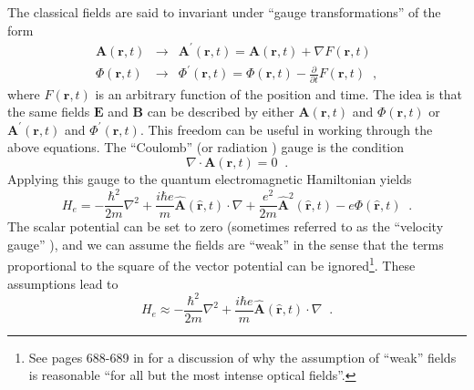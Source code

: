 The classical fields are said to invariant under ``gauge transformations'' of the form
\begin{eqnarray*}
\mathbf{A}\left(\mathbf{r},t\right)&\rightarrow & \mathbf{A}^\prime\left(\mathbf{r},t\right)=\mathbf{A}\left(\mathbf{r},t\right)+\nabla F\left(\mathbf{r},t\right)\\
\Phi\left(\mathbf{r},t\right) &\rightarrow & \Phi^\prime\left(\mathbf{r},t\right) = \Phi\left(\mathbf{r},t\right) - \frac{\partial}{\partial t} F\left(\mathbf{r},t\right)\;\;,
\end{eqnarray*}
where $F\left(\mathbf{r},t\right)$ is an arbitrary function of the position and time.  The idea is that the same fields $\mathbf{E}$ and $\mathbf{B}$ can be described by either $\mathbf{A}\left(\mathbf{r},t\right)$ and $\Phi\left(\mathbf{r},t\right)$ or $\mathbf{A}^\prime\left(\mathbf{r},t\right)$ and $\Phi^\prime\left(\mathbf{r},t\right)$.  This freedom can be useful in working through the above equations.  The ``Coulomb'' (or radiation \cite{Cohen1997}) gauge is the condition
$$
\nabla\cdot\mathbf{A}\left(\mathbf{r},t\right)=0\;\;.
$$
Applying this gauge to the quantum electromagnetic Hamiltonian yields
$$
H_e = -\frac{\hbar^2}{2m}\nabla^2 + \frac{i\hbar e}{m}\hat{\mathbf{A}}\left(\hat{\mathbf{r}},t\right)\cdot\nabla+\frac{e^2}{2m}\hat{\mathbf{A}}^2\left(\hat{\mathbf{r}},t\right)-e\Phi(\hat{\mathbf{r}},t)\;\;.
$$
The scalar potential can be set to zero (sometimes referred to as the ``velocity gauge'' \cite{Faisal1987}), and we can assume the fields are ``weak'' in the sense that the terms proportional to the square of the vector potential can be ignored\footnote{See pages 688-689 in \cite{Mandel1995} for a discussion of why the assumption of ``weak'' fields is reasonable ``for all but the most intense optical fields''.}.  These assumptions lead to
$$
H_e \approx -\frac{\hbar^2}{2m}\nabla^2 + \frac{i\hbar e}{m}\hat{\mathbf{A}}\left(\hat{\mathbf{r}},t\right)\cdot\nabla\;\;.
$$

